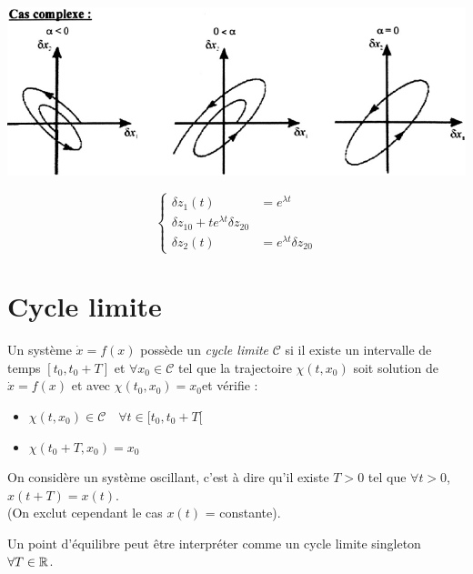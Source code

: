 \documentclass[main.tex]{subfiles}
\begin{document}
\begin{center}
\includegraphics[scale=0.5]{1/graph7.png}
\end{center}
\[
  \begin{cases}
  \delta z_1(t) & = e^{\lambda t} \\
  \delta z_{10} + te^{\lambda t} \delta z_{20}\\
  \delta z_2(t) & = e^{\lambda t} \delta z_{20}
\end{cases}
\]
\nopagebreak[1]
\section{Cycle limite}
\begin{defin}
  Un système $\dot{x}=f(x)$ possède un \emph{cycle limite} $\mathcal{C}$ si il existe un intervalle de temps $[t_0,t_0+T]$ et $\forall x_0 \in \mathcal{C}$ tel que la trajectoire $\chi(t,x_0)$ soit solution de $\dot{x}=f(x)$ et avec $\chi(t_0,x_0)=x_0$et vérifie :
  \begin{itemize}
  \item $\chi(t,x_0) \in \mathcal{C}\quad \forall t\in[t_0,t_0+T[$
  \item $\chi(t_0+T,x_0) =x_0$
  \end{itemize}
\end{defin}


On considère un système oscillant, c'est à dire qu'il existe $T>0$ tel que $\forall t > 0$, $x(t+T) = x(t)$.\\
(On exclut cependant le cas $x(t)$ = constante).
\begin{rem}
  Un point d'équilibre peut être interpréter comme un cycle limite singleton $ \forall T\in\mathbb{R}$.
\end{rem}
\end{document}
